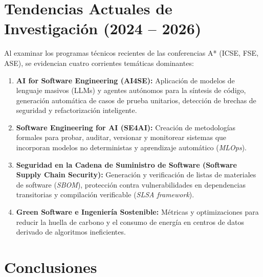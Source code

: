 \documentclass[12pt,a4paper]{article}
\begin{document}
\section{Tendencias Actuales de Investigación (2024 -- 2026)}

Al examinar los programas técnicos recientes de las conferencias A* (ICSE, FSE, ASE), se evidencian cuatro corrientes temáticas dominantes:

\begin{enumerate}[leftmargin=*]
    \item \textbf{AI for Software Engineering (AI4SE):} Aplicación de modelos de lenguaje masivos (LLMs) y agentes autónomos para la síntesis de código, generación automática de casos de prueba unitarios, detección de brechas de seguridad y refactorización inteligente.
    \item \textbf{Software Engineering for AI (SE4AI):} Creación de metodologías formales para probar, auditar, versionar y monitorear sistemas que incorporan modelos no deterministas y aprendizaje automático (\textit{MLOps}).
    \item \textbf{Seguridad en la Cadena de Suministro de Software (Software Supply Chain Security):} Generación y verificación de listas de materiales de software (\textit{SBOM}), protección contra vulnerabilidades en dependencias transitorias y compilación verificable (\textit{SLSA framework}).
    \item \textbf{Green Software e Ingeniería Sostenible:} Métricas y optimizaciones para reducir la huella de carbono y el consumo de energía en centros de datos derivado de algoritmos ineficientes.
\end{enumerate}

\section{Conclusiones}
\end{document}
